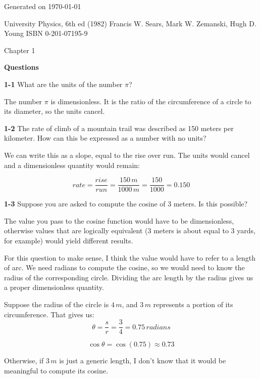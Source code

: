 \documentclass{amsart}
\begin{document}

\begin{flushright}
Generated on \today
\end{flushright}

\begin{flushleft}
University Physics, 6th ed (1982)\newline
Francis W. Sears, Mark W. Zemanski, Hugh D. Young\newline
ISBN 0-201-07195-9\newline
\end{flushleft}

Chapter 1

\textbf{Questions}

\textbf{1-1} What are the units of the number $\pi$?

The number $\pi$ is dimensionless.  It is the ratio of the circumference of a circle to its diameter,
so the units cancel.

\textbf{1-2} The rate of climb of a mountain trail was described as 150 meters per kilometer.
How can this be expressed as a number with no units?

We can write this as a slope, equal to the rise over run.
The units would cancel and a dimensionless quantity would remain:

\[
  rate = \frac{rise}{run} = \frac{150 \, m}{1000 \, m} = \frac{150}{1000} = 0.150
\]

\textbf{1-3} Suppose you are asked to compute the cosine of 3 meters. Is this possible?

The value you pass to the cosine function would have to be dimensionless, otherwise values that are logically equivalent
(3 meters is about equal to 3 yards, for example) would yield different results.

For this question to make sense, I think the value would have to refer to a length of arc.
We need radians to compute the cosine, so we would need to know the radius of the corresponding circle.
Dividing the arc length by the radius gives us a proper dimensionless quantity.

Suppose the radius of the circle is $4 \, m$, and $3 \, m$ represents a portion of its circumference.  That gives us:
\[
   \theta = \frac{s}{r} = \frac{3}{4} = 0.75 \, radians
\]

\[
   \cos \theta = \cos(0.75) \approx 0.73
\]

Otherwise, if $3\, m$ is just a generic length, I don't know that it would be meaningful to compute its cosine.
\end{document}
